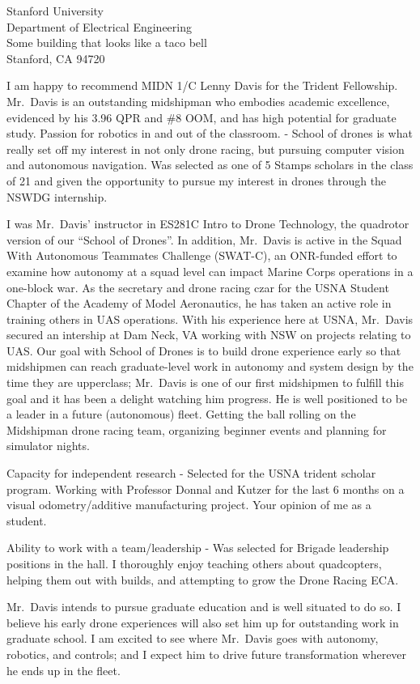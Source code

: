 \documentclass[10pt]{wrceletter}
\date{\today}
\begin{document}
\begin{letter}{%
Stanford University\\
Department of Electrical Engineering\\
Some building that looks like a taco bell\\
Stanford, CA 94720}

\opening{}
\raggedright %
\setlength{\parindent}{15pt} %

I am happy to recommend MIDN 1/C Lenny Davis for the Trident Fellowship.  Mr.~Davis is an outstanding midshipman who embodies academic excellence, evidenced by his 3.96 QPR and \#8 OOM, and has high potential for graduate study. Passion for robotics in and out of the classroom. - School of drones is what really set off my interest in not only drone racing, but pursuing computer vision and autonomous navigation. Was selected as one of 5 Stamps scholars in the class of 21 and given the opportunity to pursue my interest in drones through the NSWDG internship.  

I was Mr.~Davis’ instructor in ES281C Intro to Drone Technology, the quadrotor version of our ``School of Drones''. In addition, Mr.~Davis is active in the Squad With Autonomous Teammates Challenge (SWAT-C), an ONR-funded effort to examine how autonomy at a squad level can impact Marine Corps operations in a one-block war. As the secretary and drone racing czar for the USNA Student Chapter of the Academy of Model Aeronautics, he has taken an active role in training others in UAS operations. With his experience here at USNA, Mr.~Davis secured an intership at Dam Neck, VA working with NSW on projects relating to UAS. Our goal with School of Drones is to build drone experience early so that midshipmen can reach graduate-level work in autonomy and system design by the time they are upperclass; Mr.~Davis is one of our first midshipmen to fulfill this goal and it has been a delight watching him progress. He is well positioned to be a leader in a future (autonomous) fleet. Getting the ball rolling on the Midshipman drone racing team, organizing beginner events and planning for simulator nights. 

Capacity for independent research - Selected for the USNA trident scholar program. Working with Professor Donnal and Kutzer for the last 6 months on a visual odometry/additive manufacturing project. Your opinion of me as a student.

Ability to work with a team/leadership - Was selected for Brigade leadership positions in the hall. I thoroughly enjoy teaching others about quadcopters, helping them out with builds, and attempting to grow the Drone Racing ECA. 

Mr.~Davis intends to pursue graduate education and is well situated to do so.  I believe his early drone experiences will also set him up for outstanding work in graduate school. I am excited to see where Mr.~Davis goes with autonomy, robotics, and controls; and I expect him to drive future transformation wherever he ends up in the fleet.

\closing{~} %

\end{letter}
\end{document}
